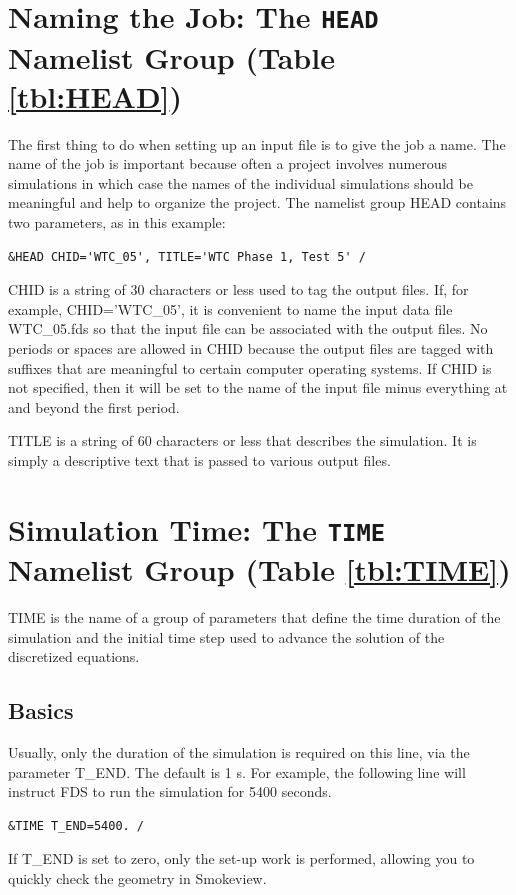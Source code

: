 \documentclass[11pt]{book}
\begin{document}
\section{Naming the Job: The \texorpdfstring{{\tt HEAD}}{HEAD} Namelist Group (Table \ref{tbl:HEAD})}
\label{info:HEAD}

The first thing to do when setting up an input file is to give the
job a name.  The name of the job is important because often a project
involves numerous simulations in which case the names of the individual
simulations should be meaningful and help to organize the project.  The namelist group {\ct HEAD} contains
two parameters, as in this example:
\begin{lstlisting}
&HEAD CHID='WTC_05', TITLE='WTC Phase 1, Test 5' /
\end{lstlisting}
\begin{description}
\item {\ct CHID} is a string of 30 characters or less used to tag the output files. If, for example, {\ct CHID='WTC\_05'}, it is convenient to name the input data file {\ct WTC\_05.fds} so that the input file can be associated with the output files. No periods or spaces are allowed in {\ct CHID} because the output files are tagged with suffixes that are meaningful to certain computer operating systems.  If {\ct CHID} is not specified, then it will be set to the name of the input file minus everything at and beyond the first period.
\item {\ct TITLE} is a string of 60 characters or less that describes the simulation. It is simply a descriptive text that is passed to various output files.
\end{description}


\section{Simulation Time: The \texorpdfstring{{\tt TIME}}{TIME} Namelist Group (Table \ref{tbl:TIME})}
\label{info:TIME}

{\ct TIME} is the name of a group of parameters that define the time
duration of the simulation and the initial time step used to advance
the solution of the discretized equations.

\subsection{Basics}
\label{info:TIME_Basics}

Usually, only the
duration of the simulation is required on this line, via the
parameter {\ct T\_END}. The default is 1 s.
For example, the following line will instruct FDS to run the simulation for 5400 seconds.
\begin{lstlisting}
&TIME T_END=5400. /
\end{lstlisting}
If {\ct T\_END} is set to zero, only the set-up work is performed,
allowing you to quickly check the geometry in Smokeview.
\end{document}
